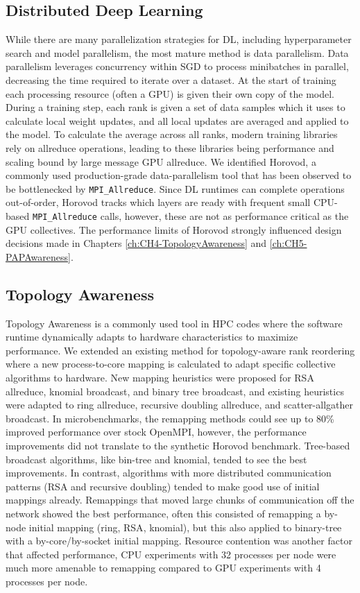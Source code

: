 \subsection{Distributed Deep Learning}
While there are many parallelization strategies for \gls{DL}, including hyperparameter search and model parallelism, the most mature method is data parallelism. 
Data parallelism leverages concurrency within \gls{SGD} to process minibatches in parallel, decreasing the time required to iterate over a dataset.
At the start of training each processing resource (often a \gls{GPU}) is given their own copy of the model.
During a training step, each rank is given a set of data samples which it uses to calculate local weight updates, and all local updates are averaged and applied to the model.
To calculate the average across all ranks, modern training libraries rely on allreduce operations, leading to these libraries being performance and scaling bound by large message \gls{GPU} allreduce.
We identified Horovod, a commonly used production-grade data-parallelism tool that has been observed to be bottlenecked by \texttt{MPI\_Allreduce}.
Since \gls{DL} runtimes can complete operations out-of-order, Horovod tracks which layers are ready with frequent small \gls{CPU}-based \texttt{MPI\_Allreduce} calls, however, these are not as performance critical as the \gls{GPU} collectives.
The performance limits of Horovod strongly influenced design decisions made in Chapters \ref{ch:CH4-TopologyAwareness} and \ref{ch:CH5-PAPAwareness}.

\subsection{Topology Awareness}
Topology Awareness is a commonly used tool in \gls{HPC} codes where the software runtime dynamically adapts to hardware characteristics to maximize performance.
We extended an existing method for topology-aware rank reordering where a new process-to-core mapping is calculated to adapt specific collective algorithms to hardware.
New mapping heuristics were proposed for \gls{RSA} allreduce, knomial broadcast, and binary tree broadcast, and existing heuristics were adapted to ring allreduce, recursive doubling allreduce, and scatter-allgather broadcast.
In microbenchmarks, the remapping methods could see up to 80\% improved performance over stock OpenMPI, however, the performance improvements did not translate to the synthetic Horovod benchmark.
Tree-based broadcast algorithms, like bin-tree and knomial, tended to see the best improvements.
In contrast, algorithms with more distributed communication patterns (\gls{RSA} and recursive doubling) tended to make good use of initial mappings already.
Remappings that moved large chunks of communication off the network showed the best performance, often this consisted of remapping a by-node initial mapping (ring, \gls{RSA}, knomial), but this also applied to binary-tree with a by-core/by-socket initial mapping.
Resource contention was another factor that affected performance, \gls{CPU} experiments with 32 processes per node were much more amenable to remapping compared to \gls{GPU} experiments with 4 processes per node. 

